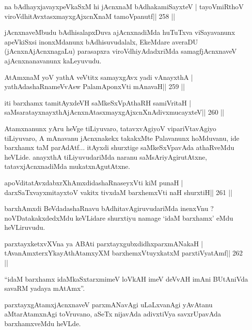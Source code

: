 \begin{shl}
na bAdhayxjavayxpeVkaSxM hi jAcnxnaM bAdhakamiSayxteV |
tayoVmiRthoV viroVdhitAvxtasxmayxgAjxcnXnaM tamoVpanutf\hfill || 258 ||
\end{shl}


\begin{artha}
jAcnxnaveMbudu bAdhisalapxDuva ajAcnxnadiMda huTuTxva viSayavanunx apeVkiSxsi inonxMdanunx bAdhisuvudalalx, EkeMdare averaDU (jAcnxnAjAcnxnagaLu) parasapxra viroVdhiyAdadxriMda samagfjAcnxnaveV ajAcnxnanavanunx kaLeyuvudu.
\end{artha}

\begin{shl}
AtAmxnaM yoV yathA veVtitx samayxgAvx yadi vA\s nayxthA |
yathAdashaRnameVvAsw PalamAponxVti mAnavaH\hfill || 259 ||
\end{shl}

\begin{shl}
iti barxhamx tamitAyxdeVH saMkeSxVpAthaRH samiVritaH |
saMsaratayxnayxthAjAcnxnAtasxmayxgAjxcnXnAdivxmucayxteV\hfill || 260 ||
\end{shl}

\begin{artha}
Atamxnanunx yAru heVge tiLiyuvaro, tatavxvAgiyoV vipariVtavAgiyo tiLiyuvaro, A mAnavanu jAcnxnakekx takakxMte Palavanunx hoMduvanu, ide barxhamx taM parAdAtf... itAyxdi shurxtige saMkeSxVpavAda athaRveMdu heVLide. anayxthA tiLiyuvudariMda naranu saMsAriyAgirutAtxne, tatavxjAcnxnadiMda mukatxnAgutAtxne.
\end{artha}

\begin{shl}
apoVditatAvxdabxrXhAmxdidashaRnaseyxVti kiM punaH |
darxSaTxvayxmitayxtoV vakitx tivxdaM barxhemxVti naH shurxtiH\hfill || 261 ||
\end{shl}

\begin{artha}
barxhAmxdi BeVdadashaRnavu bAdhitavAgiruvudariMda inenxVnu ? \-noVDatakakxdedxMdu keVLidare shurxtiyu namage \footnotemark[1]`idaM barxhamx' eMdu heVLiruvudu.
\end{artha}

\begin{shl}
parxtayxketxvXVna ya ABAti parxtayxgubxdidhxparxmANakaH |
tAvanAmxterxYkayAthAtamxyXM barxhemxVtuyxkatxM parxtiVyatAmf\hfill || 262 ||
\end{shl}

\begin{artha}
``idaM barxhamx idaMkaSxtarxmimeV loVkAH imeV deVvAH imAni BUtAniVda savaRM yadaya mAtAmx''.
\end{artha}

\begin{artha}
parxtayxgAtamxjAcnxnaveV parxmANavAgi uLaLxvanAgi yAvAtanu aMtarAtamxnAgi toVruvano, aSeTx nijavAda adivxtiVya savxrUpavAda barxhamxveMdu heVLde.
\end{artha}
